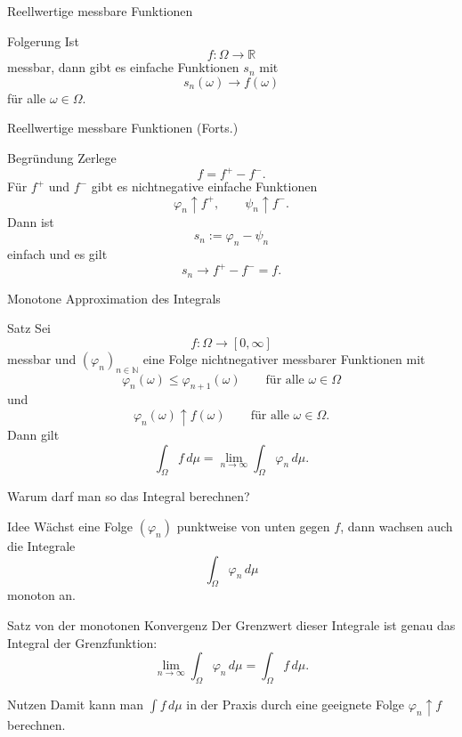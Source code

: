 \documentclass{beamer}
\begin{document}
\begin{frame}{Reellwertige messbare Funktionen}
\begin{block}{Folgerung}
Ist
\[
f\colon\Omega\to\mathbb R
\]
messbar, dann gibt es einfache Funktionen \(s_n\) mit
\[
s_n(\omega)\to f(\omega)
\]
für alle \(\omega\in\Omega\).
\end{block}
\end{frame}

\begin{frame}{Reellwertige messbare Funktionen (Forts.)}
\begin{block}{Begründung}
Zerlege
\[
f=f^+-f^-.
\]
Für \(f^+\) und \(f^-\) gibt es nichtnegative einfache Funktionen
\[
\varphi_n\uparrow f^+,
\qquad
\psi_n\uparrow f^-.
\]
Dann ist
\[
s_n:=\varphi_n-\psi_n
\]
einfach und es gilt
\[
s_n\to f^+-f^-=f.
\]
\end{block}
\end{frame}

\begin{frame}{Monotone Approximation des Integrals}
\begin{block}{Satz}
Sei
\[
f\colon \Omega\to[0,\infty]
\]
messbar und \((\varphi_n)_{n\in\mathbb N}\) eine Folge nichtnegativer messbarer Funktionen mit
\[
\varphi_n(\omega)\le \varphi_{n+1}(\omega)
\qquad\text{für alle } \omega\in\Omega
\]
und
\[
\varphi_n(\omega)\uparrow f(\omega)
\qquad\text{für alle } \omega\in\Omega.
\]
Dann gilt
\[
\int_\Omega f\,d\mu
=
\lim_{n\to\infty}\int_\Omega \varphi_n\,d\mu.
\]
\end{block}
\end{frame}

\begin{frame}[shrink=5]{Warum darf man so das Integral berechnen?}
\begin{block}{Idee}
Wächst eine Folge \((\varphi_n)\) punktweise von unten gegen \(f\), dann wachsen auch die Integrale
\[
\int_\Omega \varphi_n\,d\mu
\]
monoton an.
\end{block}

\begin{block}{Satz von der monotonen Konvergenz}
Der Grenzwert dieser Integrale ist genau das Integral der Grenzfunktion:
\[
\lim_{n\to\infty}\int_\Omega \varphi_n\,d\mu
=
\int_\Omega f\,d\mu.
\]
\end{block}

\begin{block}{Nutzen}
Damit kann man \(\int f\,d\mu\) in der Praxis durch eine geeignete Folge
\(\varphi_n\uparrow f\) berechnen.
\end{block}
\end{frame}
\end{document}
